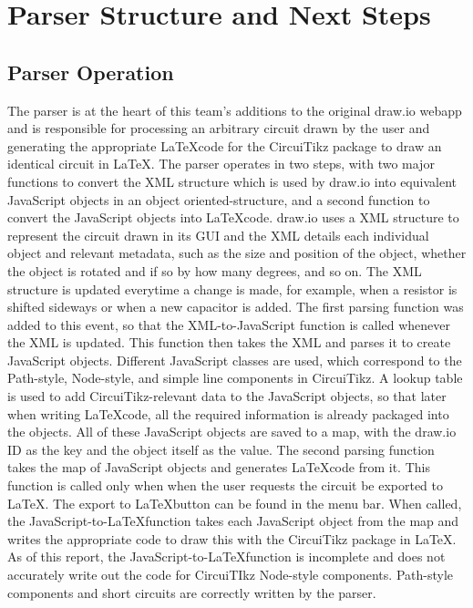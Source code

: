%
\chapter{Parser Structure and Next Steps}\label{ch:parser-structure}

\section{Parser Operation}\label{sec:parser-ops}
The parser is at the heart of this team's additions to the original draw.io webapp and is responsible for processing an arbitrary circuit drawn by the user and generating the appropriate \LaTeX code for the CircuiTikz package to draw an identical circuit in \LaTeX. The parser operates in two steps, with two major functions to convert the XML structure which is used by draw.io into equivalent JavaScript objects in an object oriented-structure, and a second function to convert the JavaScript objects into \LaTeX code.
draw.io uses a XML structure to represent the circuit drawn in its GUI and the XML details each individual object and relevant metadata, such as the size and position of the object, whether the object is rotated and if so by how many degrees, and so on. The XML structure is updated everytime a change is made, for example, when a resistor is shifted sideways or when a new capacitor is added. The first parsing function was added to this event, so that the XML-to-JavaScript function is called whenever the XML is updated. This function then takes the XML and parses it to create JavaScript objects. Different JavaScript classes are used, which correspond to the Path-style, Node-style, and simple line components in CircuiTikz. A lookup table is used to add CircuiTikz-relevant data to the JavaScript objects, so that later when writing \LaTeX code, all the required information is already packaged into the objects. All of these JavaScript objects are saved to a map, with the draw.io ID as the key and the object itself as the value.
The second parsing function takes the map of JavaScript objects and generates \LaTeX code from it. This function is called only when when the user requests the circuit be exported to \LaTeX. The export to \LaTeX button can be found in the menu bar. When called, the JavaScript-to-\LaTeX function takes each JavaScript object from the map and writes the appropriate code to draw this with the CircuiTikz package in \LaTeX. As of this report, the JavaScript-to-\LaTeX function is incomplete and does not accurately write out the code for CircuiTIkz Node-style components. Path-style components and short circuits are correctly written by the parser.

